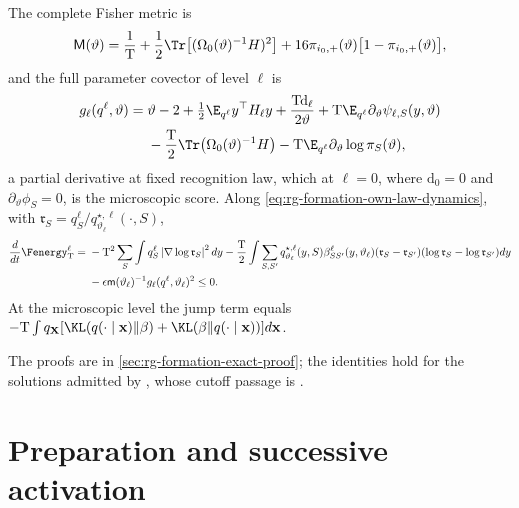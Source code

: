 The complete Fisher metric is
\begin{equation}
\mathsf M(\vartheta)
=\frac1{\mathrm T}+\frac12\Tr\bigl[(\Omega_0(\vartheta)^{-1}H)^2\bigr]
 +16\pi_{i_0,+}(\vartheta)\bigl[1-\pi_{i_0,+}(\vartheta)\bigr],
\label{eq:rg-formation-model-fisher}
\end{equation}
and the full parameter covector of level \(\ell\) is
\begin{equation}
\begin{aligned}
g_\ell(q^\ell,\vartheta)
={}&\vartheta-2+\tfrac12\E_{q^\ell}y^\top H_\ell y
       +\frac{\mathrm T \mathrm d_\ell}{2\vartheta}
       +\mathrm T\E_{q^\ell}\partial_\vartheta\psi_{\ell,S}(y,\vartheta)\\
 &-\frac{\mathrm T}2\Tr\bigl(\Omega_0(\vartheta)^{-1}H\bigr)
       -\mathrm T\E_{q^\ell}\partial_\vartheta\log\pi_S(\vartheta),
\end{aligned}
\label{eq:rg-formation-complete-score}
\end{equation}
a partial derivative at fixed recognition law, which at \(\ell=0\), where
\(\mathrm d_0=0\) and \(\partial_\vartheta\phi_S=0\), is the microscopic score.
Along \cref{eq:rg-formation-own-law-dynamics}, with
\(\mathfrak r_S=q^\ell_S/q^{\star,\ell}_{\vartheta_\ell}(\cdot,S)\),
\begin{equation}
\begin{aligned}
\frac{d}{dt}\Fenergy_{\mathrm T}^\ell
={}&-\mathrm T^2\sum_S\int q_S^\ell
       \left|\nabla\log\mathfrak r_S\right|^2dy
 -\frac{\mathrm T}2\int\sum_{S,S'}q^{\star,\ell}_{\vartheta_\ell}(y,S)\beta^\ell_{SS'}(y,\vartheta_\ell)
       (\mathfrak r_S-\mathfrak r_{S'})(\log\mathfrak r_S-\log\mathfrak r_{S'}) dy\\
 &-\epsilon \mathsf m(\vartheta_\ell)^{-1}g_\ell(q^\ell,\vartheta_\ell)^2
 \le0.
\end{aligned}
\label{eq:rg-formation-dissipation}
\end{equation}
At the microscopic level the jump term equals
\(-\mathrm T\int q_{\mathbf X}[\KL(q(\cdot\mid\mathbf x)\Vert\beta)
+\KL(\beta\Vert q(\cdot\mid\mathbf x))]d\mathbf x\). 

The proofs are in \cref{sec:rg-formation-exact-proof}; the identities hold for
the solutions admitted by , whose
cutoff passage is .

\section{Preparation and successive activation}
\label{sec:rg-formation-preparation}

